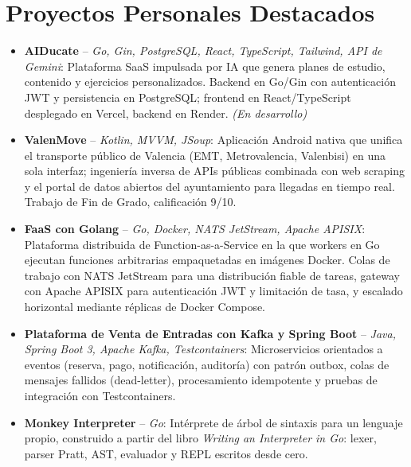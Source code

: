 \documentclass[11pt,a4paper,sans]{moderncv}
\begin{document}

\section{Proyectos Personales Destacados}
\vspace{1pt}
\begin{itemize}

\item \textbf{AIDucate} -- \textit{Go, Gin, PostgreSQL, React, TypeScript, Tailwind, API de Gemini}: Plataforma SaaS impulsada por IA que genera planes de estudio, contenido y ejercicios personalizados. Backend en Go/Gin con autenticación JWT y persistencia en PostgreSQL; frontend en React/TypeScript desplegado en Vercel, backend en Render. \textit{(En desarrollo)}

\item \textbf{ValenMove} -- \textit{Kotlin, MVVM, JSoup}: Aplicación Android nativa que unifica el transporte público de Valencia (EMT, Metrovalencia, Valenbisi) en una sola interfaz; ingeniería inversa de APIs públicas combinada con web scraping y el portal de datos abiertos del ayuntamiento para llegadas en tiempo real. Trabajo de Fin de Grado, calificación 9/10.

\item \textbf{FaaS con Golang} -- \textit{Go, Docker, NATS JetStream, Apache APISIX}: Plataforma distribuida de Function-as-a-Service en la que workers en Go ejecutan funciones arbitrarias empaquetadas en imágenes Docker. Colas de trabajo con NATS JetStream para una distribución fiable de tareas, gateway con Apache APISIX para autenticación JWT y limitación de tasa, y escalado horizontal mediante réplicas de Docker Compose.

\item \textbf{Plataforma de Venta de Entradas con Kafka y Spring Boot} -- \textit{Java, Spring Boot 3, Apache Kafka, Testcontainers}: Microservicios orientados a eventos (reserva, pago, notificación, auditoría) con patrón outbox, colas de mensajes fallidos (dead-letter), procesamiento idempotente y pruebas de integración con Testcontainers.

\item \textbf{Monkey Interpreter} -- \textit{Go}: Intérprete de árbol de sintaxis para un lenguaje propio, construido a partir del libro \textit{Writing an Interpreter in Go}: lexer, parser Pratt, AST, evaluador y REPL escritos desde cero.

\end{itemize}
\end{document}

